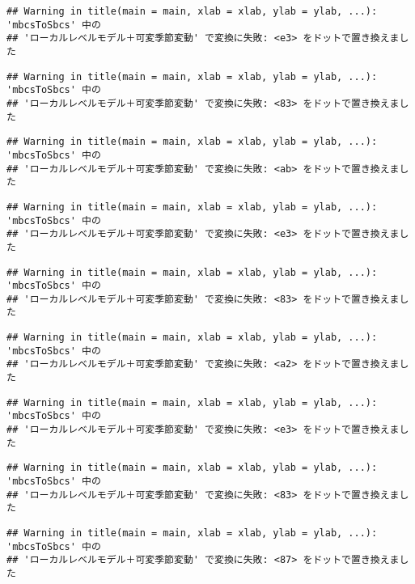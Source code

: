 \documentclass[]{article}
\begin{document}
\begin{verbatim}
## Warning in title(main = main, xlab = xlab, ylab = ylab, ...): 'mbcsToSbcs' 中の
## 'ローカルレベルモデル＋可変季節変動' で変換に失敗: <e3> をドットで置き換えました
\end{verbatim}

\begin{verbatim}
## Warning in title(main = main, xlab = xlab, ylab = ylab, ...): 'mbcsToSbcs' 中の
## 'ローカルレベルモデル＋可変季節変動' で変換に失敗: <83> をドットで置き換えました
\end{verbatim}

\begin{verbatim}
## Warning in title(main = main, xlab = xlab, ylab = ylab, ...): 'mbcsToSbcs' 中の
## 'ローカルレベルモデル＋可変季節変動' で変換に失敗: <ab> をドットで置き換えました
\end{verbatim}

\begin{verbatim}
## Warning in title(main = main, xlab = xlab, ylab = ylab, ...): 'mbcsToSbcs' 中の
## 'ローカルレベルモデル＋可変季節変動' で変換に失敗: <e3> をドットで置き換えました
\end{verbatim}

\begin{verbatim}
## Warning in title(main = main, xlab = xlab, ylab = ylab, ...): 'mbcsToSbcs' 中の
## 'ローカルレベルモデル＋可変季節変動' で変換に失敗: <83> をドットで置き換えました
\end{verbatim}

\begin{verbatim}
## Warning in title(main = main, xlab = xlab, ylab = ylab, ...): 'mbcsToSbcs' 中の
## 'ローカルレベルモデル＋可変季節変動' で変換に失敗: <a2> をドットで置き換えました
\end{verbatim}

\begin{verbatim}
## Warning in title(main = main, xlab = xlab, ylab = ylab, ...): 'mbcsToSbcs' 中の
## 'ローカルレベルモデル＋可変季節変動' で変換に失敗: <e3> をドットで置き換えました
\end{verbatim}

\begin{verbatim}
## Warning in title(main = main, xlab = xlab, ylab = ylab, ...): 'mbcsToSbcs' 中の
## 'ローカルレベルモデル＋可変季節変動' で変換に失敗: <83> をドットで置き換えました
\end{verbatim}

\begin{verbatim}
## Warning in title(main = main, xlab = xlab, ylab = ylab, ...): 'mbcsToSbcs' 中の
## 'ローカルレベルモデル＋可変季節変動' で変換に失敗: <87> をドットで置き換えました
\end{verbatim}
\end{document}
